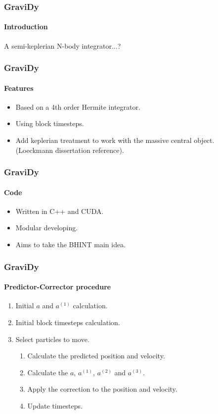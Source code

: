 \begin{frame}
    \frametitle{GraviDy}
    \framesubtitle{Introduction}
    \begin{center}
        A semi-keplerian N-body integrator...?
    \end{center}
\end{frame}

\begin{frame}
    \frametitle{GraviDy}
    \framesubtitle{Features}
    \begin{itemize}
        \item Based on a 4th order Hermite integrator.
        \item Using block timesteps.
        \item Add keplerian treatment to work with the massive central object.
              (Loeckmann dissertation reference).
    \end{itemize}
\end{frame}

\begin{frame}
    \frametitle{GraviDy}
    \framesubtitle{Code}
    \begin{itemize}
        \item Written in C++ and CUDA.
        \item Modular developing.
        \item Aims to take the BHINT main idea.
    \end{itemize}
\end{frame}

\begin{frame}
    \frametitle{GraviDy}
    \framesubtitle{Predictor-Corrector procedure}
    \begin{enumerate}
        \item Initial $a$ and $a^{(1)}$ calculation.
        \item Initial block timesteps calculation.
        \item Select particles to move.
        \begin{enumerate}
            \item Calculate the predicted position and velocity.
            \item Calculate the $a$, $a^{(1)}$, $a^{(2)}$ and $a^{(3)}$.
            \item Apply the correction to the position and velocity.
            \item Update timesteps.
        \end{enumerate}
    \end{enumerate}
\end{frame}

